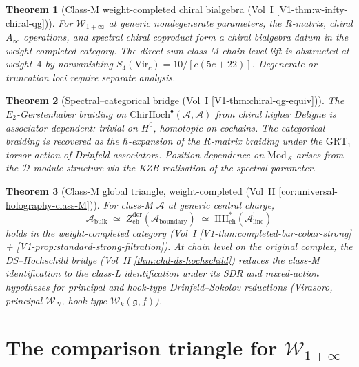 \documentclass[11pt]{article}
\newtheorem{theorem}{Theorem}[section]
\theoremstyle{remark}
\providecommand{\cA}{\mathcal{A}}
\providecommand{\cD}{\mathcal{D}}
\providecommand{\cW}{\mathcal{W}}
\providecommand{\Mod}{\mathrm{Mod}}
\providecommand{\ChirHoch}{\mathrm{ChirHoch}}
\providecommand{\fg}{\mathfrak{g}}
\begin{document}
\begin{theorem}[Class-M weight-completed chiral bialgebra (Vol~I
\ref*{V1-thm:w-infty-chiral-qg})]%
\label{thm:w-infty-chiral-qg-standalone}%
For $\cW_{1+\infty}$ at generic nondegenerate parameters, the
R-matrix, chiral $A_\infty$ operations, and spectral chiral coproduct
form a chiral bialgebra datum in the weight-completed category.  The
direct-sum class-M chain-level lift is obstructed at weight~$4$ by
nonvanishing $S_4(\mathrm{Vir}_c) = 10/[c(5c+22)]$.  Degenerate or
truncation loci require separate analysis.
\end{theorem}

\begin{theorem}[Spectral--categorical bridge (Vol~I
\ref*{V1-thm:chiral-qg-equiv})]%
\label{thm:spectral-categorical-standalone}%
The $E_2$-Gerstenhaber braiding on
$\ChirHoch^\bullet(\cA, \cA)$ from chiral higher Deligne is
associator-dependent: trivial on $H^0$, homotopic on cochains. The
categorical braiding is recovered as the $\hbar$-expansion of the
$R$-matrix braiding under the $\mathrm{GRT}_1$ torsor action of
Drinfeld associators. Position-dependence on
$\Mod_\cA$ arises from the $\cD$-module structure via the
KZB realisation of the spectral parameter.
\end{theorem}

\begin{theorem}[Class-M global triangle, weight-completed (Vol~II
\ref*{cor:universal-holography-class-M})]%
\label{thm:class-M-global-triangle-standalone}%
For class-M $\cA$ at generic central charge,
\[
  \cA_{\mathrm{bulk}}
  \;\simeq\;
  Z^{\mathrm{der}}_{\mathrm{ch}}(\cA_{\mathrm{boundary}})
  \;\simeq\;
  \mathrm{HH}^*_{\mathrm{ch}}(\cA^{!}_{\mathrm{line}})
\]
holds in the weight-completed category (Vol~I
\ref*{V1-thm:completed-bar-cobar-strong} +
\ref*{V1-prop:standard-strong-filtration}). At chain level on the
original complex, the DS--Hochschild bridge (Vol~II
\ref*{thm:chd-ds-hochschild}) reduces the class-M identification
to the class-L identification under its SDR and mixed-action
hypotheses for principal and hook-type
Drinfeld--Sokolov reductions (Virasoro, principal $\cW_N$, hook-type
$\cW_k(\fg, f)$).
\end{theorem}


\section{The comparison triangle for $\mathcal{W}_{1+\infty}$}
\label{sec:equiv-triangle}
\end{document}
